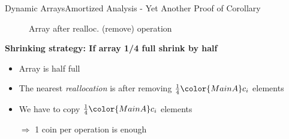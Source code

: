 \begin{frame}{Dynamic Arrays}{Amortized Analysis -
    Yet Another Proof of Corollary}
  \vspace{-2.0em}
  \begin{figure}[!h]%
    \def\FSAsize{14}\def\FSAelements{0}%
    \def\FSAcopy{7}\def\FSAdelete{1}\def\FSAinsert{0}%
    \def\FSAcopyarrow{1}%
    \def\FSAinsertarrow{1}%
    \def\FSAlabelsize{\raisebox{1.75em}{$\begin{array}{c}
        {\color{MainA}s_{i-1}-1}\\
        \text{old elements}
        \end{array}$}}%
    \def\FSAlabelinsertcapacity{removed elements}%
    \def\FSAlabelcapacity{${\color{MainA}c_i}
      = \frac{1}{2} \cdot {\color{MainA}c_{i-1}}$}%
    \vspace{-0.5em}%
    \caption{Array after realloc. (remove) operation}
    \label{fig:dynamic_fields:amortized_analysis:yapoc_array_shrink2}
  \end{figure}
  \vspace*{-1.0em}
  \textbf{Shrinking strategy: If array 1/4 full shrink by half}
  \begin{itemize}
    \item
      Array is half full
    \item
      The nearest \textit{reallocation} is after removing
      $\frac{1}{4} {\color{MainA}c_i}$ elements
    \item
      We have to copy $\frac{1}{4} {\color{MainA}c_i}$ elements
    \item[$\Rightarrow$]
      1 coin per operation is enough
  \end{itemize}
\end{frame}
